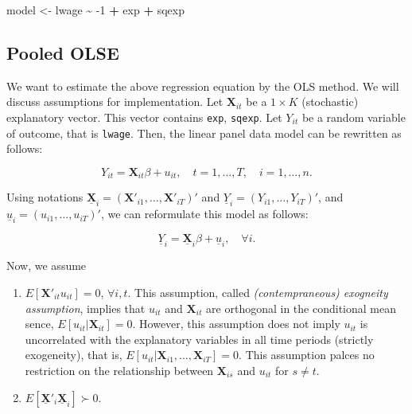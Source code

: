 \documentclass[
  12pt,
]{article}
\newenvironment{Shaded}{\begin{snugshade}}{\end{snugshade}}
\newcommand{\DecValTok}[1]{\textcolor[rgb]{0.00,0.00,0.81}{#1}}
\newcommand{\NormalTok}[1]{#1}
\newcommand{\OperatorTok}[1]{\textcolor[rgb]{0.81,0.36,0.00}{\textbf{#1}}}
\newcommand{\StringTok}[1]{\textcolor[rgb]{0.31,0.60,0.02}{#1}}
\providecommand{\tightlist}{%
  \setlength{\itemsep}{0pt}\setlength{\parskip}{0pt}}
\begin{document}
\begin{Shaded}
\begin{Highlighting}[]
\NormalTok{model \textless{}{-}}\StringTok{ }\NormalTok{lwage }\OperatorTok{\textasciitilde{}}\StringTok{ }\DecValTok{{-}1} \OperatorTok{+}\StringTok{ }\NormalTok{exp }\OperatorTok{+}\StringTok{ }\NormalTok{sqexp}
\end{Highlighting}
\end{Shaded}

\hypertarget{pooled-olse}{%
\subsection{Pooled OLSE}\label{pooled-olse}}

We want to estimate the above regression equation by the OLS method. We
will discuss assumptions for implementation. Let \(\mathbf{X}_{it}\) be
a \(1 \times K\) (stochastic) explanatory vector. This vector contains
\texttt{exp}, \texttt{sqexp}. Let \(Y_{it}\) be a random variable of
outcome, that is \texttt{lwage}. Then, the linear panel data model can
be rewritten as follows:

\[
  Y_{it} = \mathbf{X}_{it} \beta + u_{it}, \quad t = 1, \ldots, T, \quad i = 1, \ldots, n.
\]

Using notations
\(\underline{\mathbf{X}}_i = (\mathbf{X}'_{i1}, \ldots, \mathbf{X}'_{iT})'\)
and \(\underline{Y}_i = (Y_{i1}, \ldots, Y_{iT})'\), and
\(\underline{u}_i = (u_{i1}, \ldots, u_{iT})'\), we can reformulate this
model as follows:

\[
  \underline{Y}_i = \underline{\mathbf{X}}_i \beta + \underline{u}_i, \quad \forall i.
\]

Now, we assume

\begin{enumerate}
\def\labelenumi{\arabic{enumi}.}
\tightlist
\item
  \(E[\mathbf{X}'_{it}u_{it}] = 0\), \(\forall i, t\). This assumption,
  called \emph{(contempraneous) exogneity assumption}, implies that
  \(u_{it}\) and \(\mathbf{X}_{it}\) are orthogonal in the conditional
  mean sence, \(E[u_{it} | \mathbf{X}_{it}] = 0\). However, this
  assumption does not imply \(u_{it}\) is uncorrelated with the
  explanatory variables in all time periods (strictly exogeneity), that
  is, \(E[u_{it} | \mathbf{X}_{i1}, \ldots, \mathbf{X}_{iT}] = 0\). This
  assumption palces no restriction on the relationship between
  \(\mathbf{X}_{is}\) and \(u_{it}\) for \(s\not=t\).
\item
  \(E[\underline{\mathbf{X}}'_i\underline{\mathbf{X}}_i] \succ 0\).
\end{enumerate}
\end{document}
